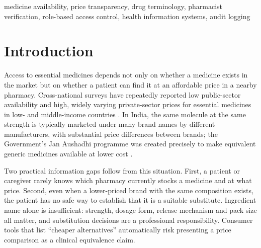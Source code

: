\documentclass[conference]{IEEEtran}
\begin{document}
\begin{IEEEkeywords}
medicine availability, price transparency, drug terminology, pharmacist verification, role-based access control, health information systems, audit logging
\end{IEEEkeywords}

\section{Introduction}
Access to essential medicines depends not only on whether a medicine exists in the market but on whether a patient can find it at an affordable price in a nearby pharmacy. Cross-national surveys have repeatedly reported low public-sector availability and high, widely varying private-sector prices for essential medicines in low- and middle-income countries \cite{cameron2009,who2008}. In India, the same molecule at the same strength is typically marketed under many brand names by different manufacturers, with substantial price differences between brands; the Government's Jan Aushadhi programme was created precisely to make equivalent generic medicines available at lower cost \cite{pmbjp}.

Two practical information gaps follow from this situation. First, a patient or caregiver rarely knows which pharmacy currently stocks a medicine and at what price. Second, even when a lower-priced brand with the same composition exists, the patient has no safe way to establish that it is a suitable substitute. Ingredient name alone is insufficient: strength, dosage form, release mechanism and pack size all matter, and substitution decisions are a professional responsibility. Consumer tools that list ``cheaper alternatives'' automatically risk presenting a price comparison as a clinical equivalence claim.
\end{document}
